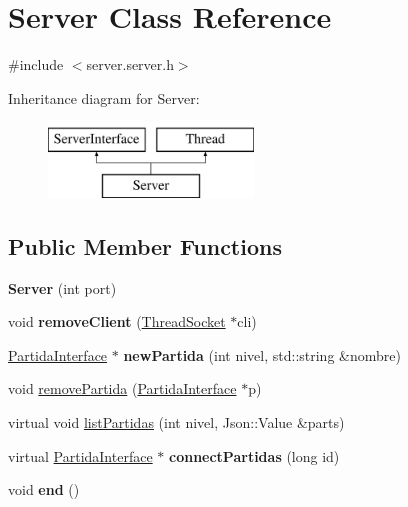 \hypertarget{classServer}{\section{Server Class Reference}
\label{classServer}
}


{\ttfamily \#include $<$server.\-server.\-h$>$}

Inheritance diagram for Server\-:\begin{figure}[H]
\begin{center}
\leavevmode
\includegraphics[height=2.000000cm]{classServer}
\end{center}
\end{figure}
\subsection*{Public Member Functions}
\begin{DoxyCompactItemize}
\item 
\hypertarget{classServer_a7d1fe6ba5f0fe9190a4f039662ea0e85}{{\bfseries Server} (int port)}\label{classServer_a7d1fe6ba5f0fe9190a4f039662ea0e85}

\item 
\hypertarget{classServer_ab16debc269fb57db4976b7199076b899}{void {\bfseries remove\-Client} (\hyperlink{classThreadSocket}{Thread\-Socket} $\ast$cli)}\label{classServer_ab16debc269fb57db4976b7199076b899}

\item 
\hypertarget{classServer_a710a8ebac1aa95fbb02458483b3bb408}{\hyperlink{classPartidaInterface}{Partida\-Interface} $\ast$ {\bfseries new\-Partida} (int nivel, std\-::string \&nombre)}\label{classServer_a710a8ebac1aa95fbb02458483b3bb408}

\item 
void \hyperlink{classServer_a1a5e9b3a3a6e4fc697163ab461fb11c6}{remove\-Partida} (\hyperlink{classPartidaInterface}{Partida\-Interface} $\ast$p)
\item 
virtual void \hyperlink{classServer_adf00f10f95cf9b49761475c73caead06}{list\-Partidas} (int nivel, Json\-::\-Value \&parts)
\item 
\hypertarget{classServer_a2af125bb682122c14979d9ead546b1a5}{virtual \hyperlink{classPartidaInterface}{Partida\-Interface} $\ast$ {\bfseries connect\-Partidas} (long id)}\label{classServer_a2af125bb682122c14979d9ead546b1a5}

\item 
\hypertarget{classServer_a83eef32fcef955048cc7ba7d35ff7552}{void {\bfseries end} ()}\label{classServer_a83eef32fcef955048cc7ba7d35ff7552}

\end{DoxyCompactItemize}
